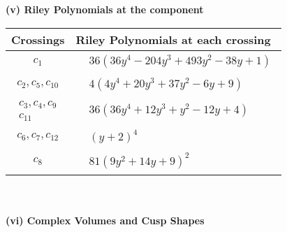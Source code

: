 \documentclass[1p]{elsarticle_modified}
\theoremstyle{definition}
\begin{document}
\newpage\renewcommand{\arraystretch}{1}
\flushleft \textbf{(v) Riley Polynomials at the component}\newline \\
\begin{tabular}{m{50pt}|m{274pt}}
Crossings & \hspace{64pt}Riley Polynomials at each crossing \\
\hline $$\begin{aligned}c_{1}\end{aligned}$$&$\begin{aligned}
&36(36 y^4-204 y^3+493 y^2-38 y+1)
\end{aligned}$\\
\hline $$\begin{aligned}c_{2},c_{5},c_{10}\end{aligned}$$&$\begin{aligned}
&4(4 y^4+20 y^3+37 y^2-6 y+9)
\end{aligned}$\\
\hline $$\begin{aligned}c_{3},c_{4},c_{9}\\c_{11}\end{aligned}$$&$\begin{aligned}
&36(36 y^4+12 y^3+y^2-12 y+4)
\end{aligned}$\\
\hline $$\begin{aligned}c_{6},c_{7},c_{12}\end{aligned}$$&$\begin{aligned}
&(y+2)^4
\end{aligned}$\\
\hline $$\begin{aligned}c_{8}\end{aligned}$$&$\begin{aligned}
&81(9 y^2+14 y+9)^2
\end{aligned}$\\
\hline
\end{tabular}\\~\\
\newpage\flushleft \textbf{(vi) Complex Volumes and Cusp Shapes}
\end{document}
